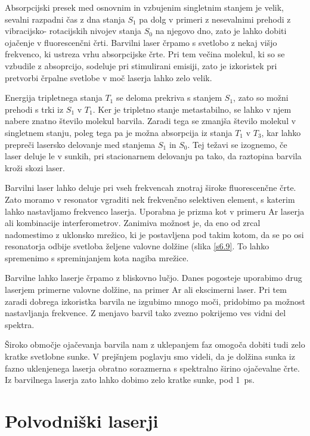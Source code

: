 Absorpcijski presek med osnovnim in vzbujenim singletnim stanjem je velik,
sevalni razpadni čas z dna stanja $S_1$ pa dolg v primeri z nesevalnimi
prehodi z vibracijsko- rotacijskih nivojev stanja $S_0$ na njegovo dno, zato
je lahko dobiti ojačenje v fluorescenčni črti. Barvilni laser črpamo s
svetlobo z nekaj višjo frekvenco, ki ustreza vrhu absorpcijske črte. Pri
tem večina molekul, ki so se vzbudile z absoprcijo, sodeluje pri
stimulirani emisiji, zato je izkoristek pri pretvorbi črpalne svetlobe v
moč laserja lahko zelo velik.

Energija tripletnega stanja $T_1$ se deloma prekriva s stanjem $S_1$, zato
so možni prehodi s trki iz $S_1$ v $T_1$. Ker je tripletno stanje
metastabilno, se lahko v njem nabere znatno število molekul barvila. Zaradi
tega se zmanjša število molekul v singletnem stanju, poleg tega pa je
možna absorpcija iz stanja $T_1$ v $T_3$, kar lahko prepreči lasersko
delovanje med stanjema $S_1$ in $S_0$. Tej težavi se izognemo, če laser
deluje le v sunkih, pri stacionarnem delovanju pa tako, da raztopina barvila
kroži skozi laser.

Barvilni laser lahko deluje pri vseh frekvencah znotraj široke
fluorescenčne črte. Zato moramo v resonator vgraditi nek frekvenčno
selektiven element, s katerim lahko nastavljamo frekvenco laserja. Uporabna
je prizma kot v primeru Ar laserja ali kombinacije interferometrov. Zanimiva
možnost je, da eno od zrcal nadomestimo z uklonsko mrežico, ki je
postavljena pod takim kotom, da se po osi resonatorja odbije svetloba
željene valovne dolžine (slika \ref{s6.9}. To lahko spremenimo s
spreminjanjem kota nagiba mrežice.

Barvilne lahko laserje črpamo z bliskovno lučjo. Danes pogosteje uporabimo
drug laserjem primerne valovne dolžine, na primer Ar ali ekscimerni laser.
Pri tem zaradi dobrega izkoristka barvila ne izgubimo mnogo moči, pridobimo
pa možnost nastavljanja frekvence. Z menjavo barvil tako zvezno pokrijemo
ves vidni del spektra.

Široko območje ojačevanja barvila nam z uklepanjem faz omogoča dobiti
tudi zelo kratke svetlobne sunke. V prejšnjem poglavju smo videli, da je
dolžina sunka iz fazno uklenjenega laserja obratno sorazmerna s spektralno
širino ojačevalne črte. Iz barvilnega laserja zato lahko dobimo zelo
kratke sunke, pod 1~ps.


\section{Polvodniški laserji}

